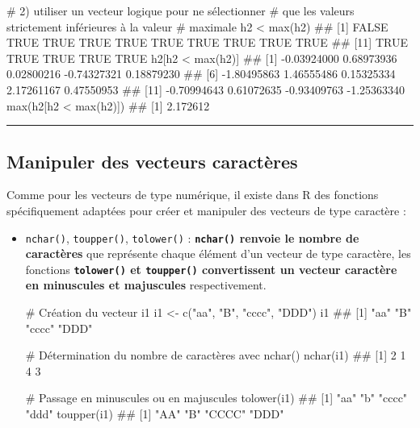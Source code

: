 \documentclass[12pt,twosided, notitlepage]{book}
\newenvironment{Shaded}{}{}
\newcommand{\KeywordTok}[1]{\textcolor[rgb]{0.00,0.00,1.00}{{#1}}}
\newcommand{\StringTok}[1]{\textcolor[rgb]{0.00,0.50,0.50}{{#1}}}
\newcommand{\CommentTok}[1]{\textcolor[rgb]{0.00,0.50,0.00}{{#1}}}
\newcommand{\NormalTok}[1]{{#1}}
\renewenvironment{Shaded}{\begin{snugshade}}{\end{snugshade}}
\begin{document}
\begin{enumerate}
\begin{Shaded}
\begin{Highlighting}[]
\CommentTok{# 2) utiliser un vecteur logique pour ne sélectionner }
\CommentTok{# que les valeurs strictement inférieures à la valeur }
\CommentTok{# maximale }
\NormalTok{h2 <}\StringTok{ }\KeywordTok{max}\NormalTok{(h2)}
  \NormalTok{##  [1] FALSE  TRUE  TRUE  TRUE  TRUE  TRUE  TRUE  TRUE  TRUE  TRUE}
  \NormalTok{## [11]  TRUE  TRUE  TRUE  TRUE  TRUE}
\NormalTok{h2[h2 <}\StringTok{ }\KeywordTok{max}\NormalTok{(h2)]}
  \NormalTok{##  [1] -0.03924000  0.68973936  0.02800216 -0.74327321  0.18879230}
  \NormalTok{##  [6] -1.80495863  1.46555486  0.15325334  2.17261167  0.47550953}
  \NormalTok{## [11] -0.70994643  0.61072635 -0.93409763 -1.25363340}
\KeywordTok{max}\NormalTok{(h2[h2 <}\StringTok{ }\KeywordTok{max}\NormalTok{(h2)])}
  \NormalTok{## [1] 2.172612}
\end{Highlighting}
\end{Shaded}

  \begin{center} \rule{0.5\linewidth}{\linethickness}\end{center}

  \bigskip  \fi 
\end{enumerate}

\subsection{Manipuler des vecteurs
caractères}\label{manipuler-des-vecteurs-caracteres}

Comme pour les vecteurs de type numérique, il existe dans R des
fonctions spécifiquement adaptées pour créer et manipuler des vecteurs
de type caractère :

\begin{itemize}
\item
  \texttt{nchar()},
  \texttt{toupper()},
  \texttt{tolower()} :
  \textbf{\texttt{nchar()} renvoie le nombre de caractères} que
  représente chaque élément d'un vecteur de type caractère, les
  fonctions \textbf{\texttt{tolower()} et \texttt{toupper()}
  convertissent un vecteur caractère en minuscules et majuscules}
  respectivement.

\begin{Shaded}
\begin{Highlighting}[]
\CommentTok{# Création du vecteur i1}
\NormalTok{i1 <-}\StringTok{ }\KeywordTok{c}\NormalTok{(}\StringTok{"aa"}\NormalTok{, }\StringTok{"B"}\NormalTok{, }\StringTok{"cccc"}\NormalTok{, }\StringTok{"DDD"}\NormalTok{)}
\NormalTok{i1}
  \NormalTok{## [1] "aa"   "B"    "cccc" "DDD"}

\CommentTok{# Détermination du nombre de caractères avec nchar()}
\KeywordTok{nchar}\NormalTok{(i1)}
  \NormalTok{## [1] 2 1 4 3}

\CommentTok{# Passage en minuscules ou en majuscules}
\KeywordTok{tolower}\NormalTok{(i1)}
  \NormalTok{## [1] "aa"   "b"    "cccc" "ddd"}
\KeywordTok{toupper}\NormalTok{(i1)}
  \NormalTok{## [1] "AA"   "B"    "CCCC" "DDD"}
\end{Highlighting}
\end{Shaded}
\end{itemize}
\end{document}
